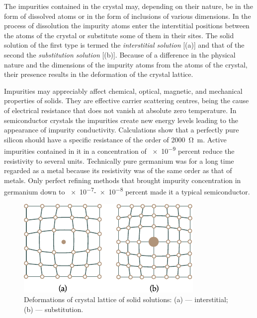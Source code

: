 The impurities contained in the crystal may, depending on their nature, be in the form of dissolved atoms or in the form of inclusions of various dimensions. In the process of dissolution the impurity atoms enter the interstitial positions between the atoms of the crystal or substitute some of them in their sites. The solid solution of the first type is termed the \textit{interstitial solution} [(a)] and that of the second the \textit{substitution solution} [(b)]. Because of a difference in the physical nature and the dimensions of the impurity atoms from the atoms of the crystal, their presence results in the deformation of the crystal lattice.

Impurities may appreciably affect chemical, optical, magnetic, and mechanical properties of solids. They are effective carrier scattering centres, being the cause of electrical resistance that does not vanish at absolute zero temperature. In semiconductor crystals the impurities create new energy levels leading to the appearance of impurity conductivity. Calculations show that a perfectly pure silicon should have a specific resistance of the order of \SI{2000}{\ohm\metre}. Active impurities contained in it in a concentration of \num{e-9} percent reduce the resistivity to several units. Technically pure germanium was for a long time regarded as a metal because its resistivity was of the same order as that of metals. Only perfect refining methods that brought impurity concentration in germanium down to \num{e-7}-\num{e-8} percent made it a typical semiconductor.

\begin{figure}[t]
	\begin{center}
		\includegraphics[scale=1.1]{figures/ch_01/fig_1_26.pdf}
		\caption[]{Deformations of crystal lattice of solid solutions: (a) --- interstitial; (b) --- substitution.}
		\label{fig:1_26}
	\end{center}
	\vspace{-0.7cm}
\end{figure}

